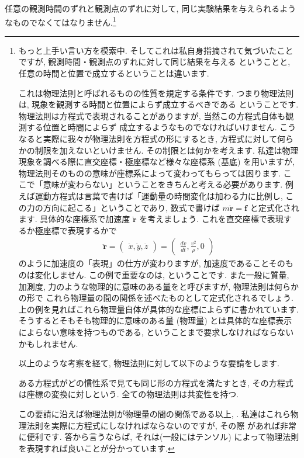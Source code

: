 \documentclass[openany, a4paper, oneside]{jsbook}
\begin{document}
任意の観測時間のずれと観測点のずれに対して, 同じ実験結果を与えられるようなものでなくてはなりません.\footnote{もっと上手い言い方を模索中.
そしてこれは私自身指摘されて気づいたことですが, 観測時間・観測点のずれに対して同じ結果を与える
ということと, 任意の時間と位置で成立するということは違います.

これは物理法則と呼ばれるものの性質を規定する条件です.
つまり物理法則は, 現象を観測する時間と位置によらず成立するべきである
ということです.
物理法則は方程式で表現されることがありますが, 当然この方程式自体も観測する位置と時間によらず
成立するようなものでなければいけません.
こうなると実際に我々が物理法則を方程式の形にするとき, 方程式に対して何らかの制限を加えないといけません.
その制限とは何かを考えます.
私達は物理現象を調べる際に直交座標・極座標など様々な座標系 (基底) を用いますが,
物理法則そのものの意味が座標系によって変わってもらっては困ります.
ここで「意味が変わらない」ということをきちんと考える必要があります.
例えば運動方程式は言葉で書けば「運動量の時間変化は加わる力に比例し, この力の方向に起こる」ということであり,
数式で書けば
 $m \ddot{ \bm {r} } = \bm{f}$
と定式化されます.
具体的な座標系で加速度 $\ddot{ \bm {r} }$ を考えましょう.
これを直交座標で表現するか極座標で表現するかで
\begin{align}
    \ddot{ \bm {r} }
    =
    \begin{pmatrix}
        \ddot{x},\ddot{y},\ddot{z}
    \end{pmatrix}
    =
    \begin{pmatrix}
        \frac{d v} {dt},\frac{v^2} {\rho },0
    \end{pmatrix}
\end{align}
のように加速度の「表現」の仕方が変わりますが, 加速度であることそのものは変化しません.
この例で重要なのは, ということです.
また一般に質量, 加測度, 力のような物理的に意味のある量をと呼びますが, 物理法則は何らかの形で
これら物理量の間の関係を述べたものとして定式化されるでしょう.
上の例を見ればこれら物理量自体が具体的な座標によらずに書かれています.
そうするとそもそも物理的に意味のある量 (物理量) とは具体的な座標表示によらない意味を持つものである,
ということまで要求しなければならないかもしれません.

以上のような考察を経て, 物理法則に対して以下のような要請をします.
\begin{req}
ある方程式がどの慣性系で見ても同じ形の方程式を満たすとき,
その方程式は座標の変換に対しという.
全ての物理法則は共変性を持つ.
\end{req}
この要請に沿えば物理法則が物理量の間の関係である以上, .
私達はこれら物理法則を実際に方程式にしなければならないのですが, その際
があれば非常に便利です.
答から言うならば, それは(一般にはテンソル) によって物理法則を表現すれば良いことが分かっています.}
\end{document}
